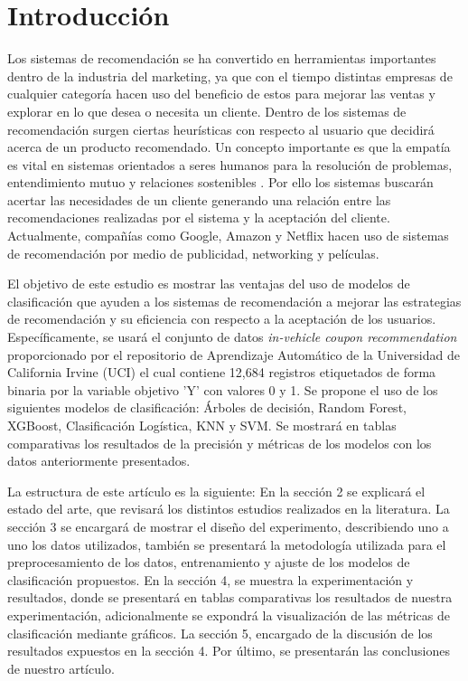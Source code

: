 \documentclass[conference]{IEEEtran}
\begin{document}
\section{Introducción}
Los sistemas de recomendación se ha convertido en herramientas importantes dentro de la industria del marketing, ya que con el tiempo distintas empresas de cualquier categoría hacen uso del beneficio de estos para mejorar las ventas y explorar en lo que desea o necesita un cliente. Dentro de los sistemas de recomendación surgen ciertas heurísticas con respecto al usuario que decidirá acerca de un producto recomendado. Un concepto importante es que la empatía es vital en sistemas orientados a seres humanos para la resolución de problemas, entendimiento mutuo y relaciones sostenibles \cite{b1}. Por ello los sistemas buscarán acertar las necesidades de un cliente generando una relación entre las recomendaciones realizadas por el sistema y la aceptación del cliente. Actualmente, compañías como Google, Amazon y Netflix hacen uso de sistemas de recomendación por medio de publicidad, networking y películas.

El objetivo de este estudio es mostrar las ventajas del uso de modelos de clasificación que ayuden a los sistemas de recomendación a mejorar las estrategias de recomendación y su eficiencia con respecto a la aceptación de los usuarios. Específicamente, se usará el conjunto de datos \textit{in-vehicle coupon recommendation}\cite{b2} proporcionado por el repositorio de Aprendizaje Automático de la  Universidad de California Irvine (UCI) el cual contiene 12,684 registros etiquetados de forma binaria por la variable objetivo 'Y' con valores 0 y 1. Se propone el uso de los siguientes modelos de clasificación: Árboles de decisión, Random Forest, XGBoost, Clasificación Logística, KNN y SVM. Se mostrará en tablas comparativas los resultados de la precisión y métricas de los modelos con los datos anteriormente presentados.

La estructura de este artículo es la siguiente: En la sección 2 se explicará el estado del arte, que revisará los distintos estudios realizados en la literatura. La sección 3 se encargará de mostrar el diseño del experimento, describiendo uno a uno los datos utilizados, también se presentará la metodología utilizada para el preprocesamiento de los datos, entrenamiento y ajuste de los modelos de clasificación propuestos. En la sección 4, se muestra la experimentación y resultados, donde se presentará en tablas comparativas los resultados de nuestra experimentación, adicionalmente se expondrá la visualización de las métricas de clasificación mediante gráficos. La sección 5, encargado de la discusión de los resultados expuestos en la sección 4. Por último, se presentarán las conclusiones de nuestro artículo.
\end{document}
